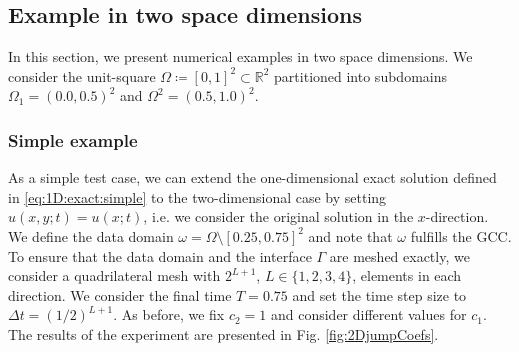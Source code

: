 \documentclass[sn-mathphys-num]{sn-jnl}
\numberwithin{equation}{section}
\begin{document}
\begin{comment}
                \draw[dashed,gray,very thick] (0.4,-2) -- (0.4,2);
                \draw[dashed,gray,very thick] (0.63188,-2) -- (0.63188,2);
                \node [draw=none] at (axis description cs:0.38,0.65) {\color{gray} $\Gamma_1$};
                \node [draw=none] at (axis description cs:0.71,0.65) {\color{gray} $\Gamma_2$};
                \node [draw=none] at (axis description cs:0.2,0.15) {\color{gray} $\omega$};
                \node [draw=none] at (axis description cs:0.8,0.15) {\color{gray} $\omega$};
                

            \end{groupplot}
        \end{tikzpicture}
    \end{center}
    \caption{Exact solution (left) and approximated solution with $k = 3$ (right) of \eqref{eq:1D:exact:simpleMult} at $t = 0.25$ with $c_1 = c_3 = 11.5$ and $c_2 = 1.0$ (uniform mesh), computed with $64$ points in space, $32$ in time and $T = 0.5$.}
    \label{fig:jumpCoefs:multipleJumps3}
  \end{figure}
\end{comment}





\subsection{Example in two space dimensions}
\noindent In this section, we present numerical examples in two space dimensions. We consider the unit-square $\Omega \coloneqq [0,1]^2 \subset \mathbb{R}^2$ partitioned into subdomains $\Omega_1 = (0.0,0.5)^2$ and $\Omega^2 = (0.5,1.0)^2$. 

\subsubsection{Simple example} 
As a simple test case, we can extend the one-dimensional exact solution defined in \eqref{eq:1D:exact:simple} to the two-dimensional case by setting $u(x,y;t) = u(x;t)$, i.e. we consider the original solution in the $x$-direction. We define the data domain $\omega = \Omega \setminus [0.25,0.75]^2$ and note that $\omega$ fulfills the GCC. To ensure that the data domain and the interface $\Gamma$ are meshed exactly, we consider a quadrilateral mesh with $2^{L+1}$, $L \in \{1,2,3,4\}$, elements in each direction. We consider the final time $T = 0.75$  and set the time step size to $\Delta t = (1/2)^{L+1}$. As before, we fix $c_2 = 1$ and consider different values for $c_1$. The results of the experiment are presented in Fig. \ref{fig:2DjumpCoefs}. 
\end{document}
